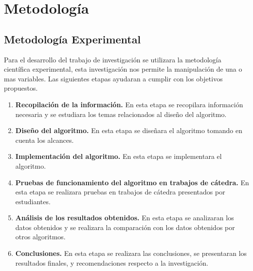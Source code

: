 \section{Metodología}
\subsection{Metodología Experimental}
Para el desarrollo del trabajo de investigación se utilizara la metodología científica experimental, esta investigación
nos permite la manipulación de una o mas variables. Las siguientes etapas ayudaran a cumplir con los objetivos propuestos.
\begin{enumerate}
  \item \textbf{Recopilación de la información.} En esta etapa se recopilara información necesaria y se estudiara los temas relacionados al diseño del algoritmo.
  \item \textbf{Diseño del algoritmo.} En esta etapa se diseñara el algoritmo tomando en cuenta los alcances.
  \item \textbf{Implementación del algoritmo.} En esta etapa se implementara el algoritmo.
  \item \textbf{Pruebas de funcionamiento del algoritmo en trabajos de cátedra.} En esta etapa se realizara pruebas en trabajos de cátedra presentados por estudiantes.
  \item \textbf{Análisis de los resultados obtenidos.} En esta etapa se analizaran los datos obtenidos y se realizara la comparación con los datos obtenidos por otros algoritmos.
  \item \textbf{Conclusiones.} En esta etapa se realizara las conclusiones, se presentaran los resultados finales, y recomendaciones respecto a la investigación.
\end{enumerate}
